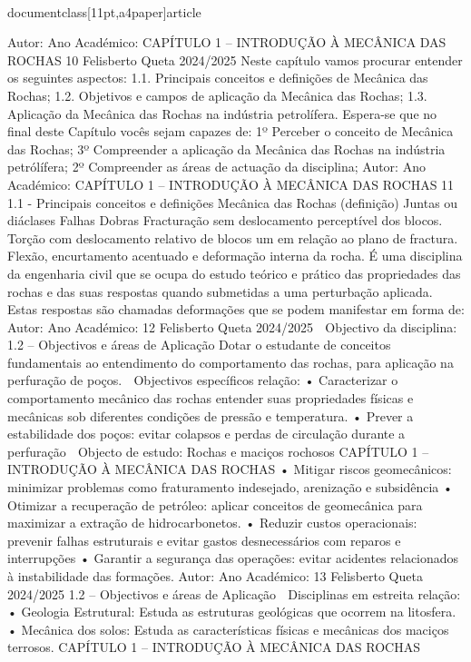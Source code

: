 \\documentclass[11pt,a4paper]{article}
\begin{document}
Autor:
Ano Académico:
CAPÍTULO 1 
–
 INTRODUÇÃO À MECÂNICA DAS ROCHAS 10
Felisberto Queta
2024/2025
Neste capítulo vamos procurar entender os seguintes aspectos:
1.1. Principais conceitos e definições de Mecânica das Rochas;
1.2. Objetivos e campos de aplicação da Mecânica das Rochas;
1.3. Aplicação da Mecânica das Rochas na indústria petrolífera.
Espera-se que no final deste Capítulo vocês sejam capazes de:
1º Perceber o conceito de Mecânica das Rochas; 
3º Compreender a aplicação da Mecânica das Rochas na indústria petrólífera;
2º Compreender as áreas de actuação da disciplina;
Autor:
Ano Académico:
CAPÍTULO 1 
–
 INTRODUÇÃO À MECÂNICA DAS ROCHAS 11
1.1 - Principais conceitos e definições 
Mecânica das Rochas (definição)
Juntas ou diáclases Falhas Dobras
Fracturação sem 
deslocamento perceptível dos 
blocos.
Torção com deslocamento 
relativo de blocos um em 
relação ao plano de fractura.
Flexão,  encurtamento
acentuado e deformação
interna da rocha.
É uma disciplina da engenharia civil que se ocupa do estudo teórico e prático das propriedades das
rochas e das suas respostas quando submetidas a uma perturbação aplicada. Estas respostas são
chamadas deformações que se podem manifestar em forma de:
Autor:
Ano Académico:
12
Felisberto Queta
2024/2025
 Objectivo da disciplina:
1.2 – Objectivos e áreas de Aplicação
Dotar o estudante de conceitos fundamentais ao entendimento do comportamento das rochas, para aplicação na perfuração
de poços.
 Objectivos específicos relação:
• Caracterizar o comportamento
mecânico das rochas
entender suas propriedades físicas e mecânicas sob diferentes condições de
pressão e temperatura.
• Prever a estabilidade dos poços: evitar colapsos e perdas de circulação durante a perfuração
 Objecto de estudo:
Rochas e maciços rochosos
CAPÍTULO 1 
–
 INTRODUÇÃO À MECÂNICA DAS ROCHAS
• Mitigar riscos geomecânicos: minimizar problemas como fraturamento indesejado, arenização e subsidência
• Otimizar a recuperação de petróleo: aplicar conceitos de geomecânica para maximizar a extração de
hidrocarbonetos.
• Reduzir custos operacionais: prevenir falhas estruturais e evitar gastos desnecessários com reparos e
interrupções
• Garantir a segurança das operações: evitar acidentes relacionados à instabilidade das formações.
Autor:
Ano Académico:
13
Felisberto Queta
2024/2025
1.2 – Objectivos e áreas de Aplicação
 Disciplinas em estreita relação:
• Geologia Estrutural: Estuda as estruturas geológicas que ocorrem na litosfera.
• Mecânica dos solos: Estuda as características físicas e mecânicas dos maciços terrosos.
CAPÍTULO 1 
–
 INTRODUÇÃO À MECÂNICA DAS ROCHAS
\end{document}
